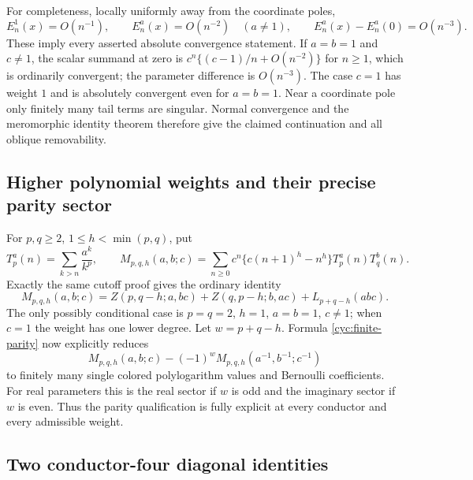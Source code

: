 \documentclass[11pt,a4paper]{article}
\numberwithin{equation}{section}
\theoremstyle{definition}
\theoremstyle{remark}
\begin{document}
For completeness, locally uniformly away from the coordinate poles,
\[
 E_n^1(x)=O(n^{-1}),\qquad E_n^a(x)=O(n^{-2})\quad(a\ne1),
 \qquad E_n^a(x)-E_n^a(0)=O(n^{-3}).
\]
These imply every asserted absolute convergence statement.  If
$a=b=1$ and $c\ne1$, the scalar summand at zero is
$c^n\{(c-1)/n+O(n^{-2})\}$ for $n\ge1$, which is ordinarily
convergent; the parameter difference is $O(n^{-3})$.  The case
$c=1$ has weight $1$ and is absolutely convergent even for $a=b=1$.
Near a coordinate pole only finitely many tail terms are singular.
Normal convergence and the meromorphic identity theorem therefore
give the claimed continuation and all oblique removability.

\subsection{Higher polynomial weights and their precise parity sector}

For $p,q\ge2$, $1\le h<\min(p,q)$, put
\[
 T_p^a(n)=\sum_{k>n}\frac{a^k}{k^p},\qquad
 M_{p,q,h}(a,b;c)=\sum_{n\ge0}c^n
       \{c(n+1)^h-n^h\}T_p^a(n)T_q^b(n).
\]
Exactly the same cutoff proof gives the ordinary identity
\begin{equation}\label{cyc:allweights}
 M_{p,q,h}(a,b;c)=Z(p,q-h;a,bc)+Z(q,p-h;b,ac)
                         +L_{p+q-h}(abc).
\end{equation}
The only possibly conditional case is $p=q=2$, $h=1$,
$a=b=1$, $c\ne1$; when $c=1$ the weight has one lower degree.
Let $w=p+q-h$.  Formula \eqref{cyc:finite-parity} now explicitly
reduces
\[
 M_{p,q,h}(a,b;c)-(-1)^w
 M_{p,q,h}(a^{-1},b^{-1};c^{-1})
\]
to finitely many single colored polylogarithm values and Bernoulli
coefficients.  For real parameters this is the real sector if $w$
is odd and the imaginary sector if $w$ is even.  Thus the parity
qualification is fully explicit at every conductor and every
admissible weight.

\subsection{Two conductor-four diagonal identities}
\end{document}
